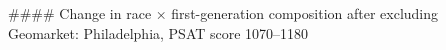 #### Change in race × first-generation composition after excluding Geomarket: Philadelphia, PSAT score 1070–1180
